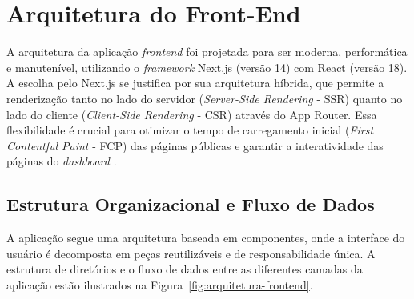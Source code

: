 \section{Arquitetura do Front-End}

A arquitetura da aplicação \textit{frontend} foi projetada para ser moderna, performática e manutenível, utilizando o \textit{framework} Next.js (versão 14) com React (versão 18). A escolha pelo Next.js se justifica por sua arquitetura híbrida, que permite a renderização tanto no lado do servidor (\textit{Server-Side Rendering} - SSR) quanto no lado do cliente (\textit{Client-Side Rendering} - CSR) através do App Router. Essa flexibilidade é crucial para otimizar o tempo de carregamento inicial (\textit{First Contentful Paint} - FCP) das páginas públicas e garantir a interatividade das páginas do \textit{dashboard} \cite{STRAPI2024}.

\subsection{Estrutura Organizacional e Fluxo de Dados}

A aplicação segue uma arquitetura baseada em componentes, onde a interface do usuário é decomposta em peças reutilizáveis e de responsabilidade única. A estrutura de diretórios e o fluxo de dados entre as diferentes camadas da aplicação estão ilustrados na Figura~\ref{fig:arquitetura-frontend}.

